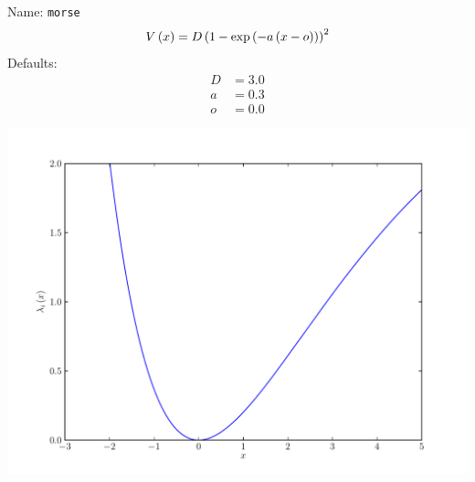 \documentclass[a4paper,10pt]{report}
\begin{document}
\begin{minipage}{0.5\linewidth}
  Name:    \texttt{morse}
  \begin{equation*}
    V\left( x \right) = D \left(1 - \exp\left(-a\left(x-o\right)\right)\right)^2
  \end{equation*}
  Defaults:
  \begin{align*}
    D &= 3.0 \\
    a &= 0.3 \\
    o &= 0.0
  \end{align*}
\end{minipage}
\begin{minipage}{0.5\linewidth}
  \begin{center}
    \includegraphics[scale=0.25]{./fig/morse.pdf}
  \end{center}
\end{minipage}
\end{document}
